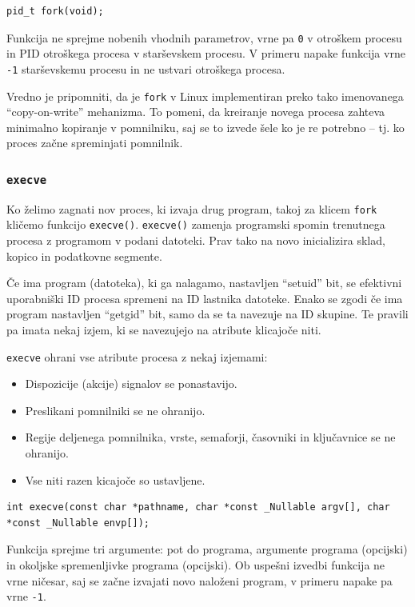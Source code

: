 \documentclass[a4paper,12pt,openright]{book}
\begin{document}
\begin{lstlisting}[style=func]
 pid_t fork(void);
\end{lstlisting}

Funkcija ne sprejme nobenih vhodnih parametrov, vrne pa \texttt{0} v otroškem procesu in PID otroškega procesa v starševskem procesu.
V primeru napake funkcija vrne \texttt{-1} starševskemu procesu in ne ustvari otroškega procesa.

Vredno je pripomniti, da je \texttt{fork} v Linux implementiran preko tako imenovanega ``copy-on-write'' mehanizma.
To pomeni, da kreiranje novega procesa zahteva minimalno kopiranje v pomnilniku, saj se to izvede šele ko je re potrebno -- tj. ko proces začne spreminjati pomnilnik.

\subsubsection{\texttt{execve}}

Ko želimo zagnati nov proces, ki izvaja drug program, takoj za klicem \texttt{fork} kličemo funkcijo \texttt{execve()}.
\texttt{execve()} zamenja programski spomin trenutnega procesa z programom v podani datoteki.
Prav tako na novo inicializira sklad, kopico in podatkovne segmente.

Če ima program (datoteka), ki ga nalagamo, nastavljen ``setuid'' bit, se efektivni uporabniški ID procesa spremeni na ID lastnika datoteke.
Enako se zgodi če ima program nastavljen ``getgid'' bit, samo da se ta navezuje na ID skupine.
Te pravili pa imata nekaj izjem, ki se navezujejo na atribute klicajoče niti.

\texttt{execve} ohrani vse atribute procesa z nekaj izjemami:
\begin{itemize}
	\item Dispozicije (akcije) signalov se ponastavijo.
	\item Preslikani pomnilniki se ne ohranijo.
	\item Regije deljenega pomnilnika, vrste, semaforji, časovniki in ključavnice se ne ohranijo.
	\item Vse niti razen kicajoče so ustavljene.
\end{itemize}

\begin{lstlisting}[style=func]
 int execve(const char *pathname, char *const _Nullable argv[], char *const _Nullable envp[]);
\end{lstlisting}

Funkcija sprejme tri argumente: pot do programa, argumente programa (opcijski) in okoljske spremenljivke programa (opcijski).
Ob uspešni izvedbi funkcija ne vrne ničesar, saj se začne izvajati novo naloženi program, v primeru napake pa vrne \texttt{-1}.
\end{document}
